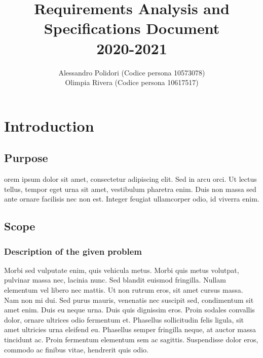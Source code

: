 \documentclass{article}
\title{ Requirements Analysis and Specifications Document\\2020-2021}
\author{Alessandro Polidori (Codice persona 10573078)\\Olimpia Rivera (Codice persona 10617517)}
\date{}
\begin{document}
\maketitle
\tableofcontents{}

\newpage

\section{Introduction}

\subsection{Purpose}
orem ipsum dolor sit amet, consectetur adipiscing elit. Sed in arcu orci. Ut lectus tellus, tempor eget urna sit amet, vestibulum pharetra enim. Duis non massa sed ante ornare facilisis nec non est. Integer feugiat ullamcorper odio, id viverra enim.\\
\subsection{Scope}
\subsubsection{Description of the given problem}
Morbi sed vulputate enim, quis vehicula metus. Morbi quis metus volutpat, pulvinar massa nec, lacinia nunc. Sed blandit euismod fringilla. Nullam elementum vel libero nec mattis. Ut non rutrum eros, sit amet cursus massa. Nam non mi dui. Sed purus mauris, venenatis nec suscipit sed, condimentum sit amet enim. Duis eu neque urna. Duis quis dignissim eros. Proin sodales convallis dolor, ornare ultrices odio fermentum et. Phasellus sollicitudin felis ligula, sit amet ultricies urna eleifend eu. Phasellus semper fringilla neque, at auctor massa tincidunt ac. Proin fermentum elementum sem ac sagittis. Suspendisse dolor eros, commodo ac finibus vitae, hendrerit quis odio.\\
\end{document}
